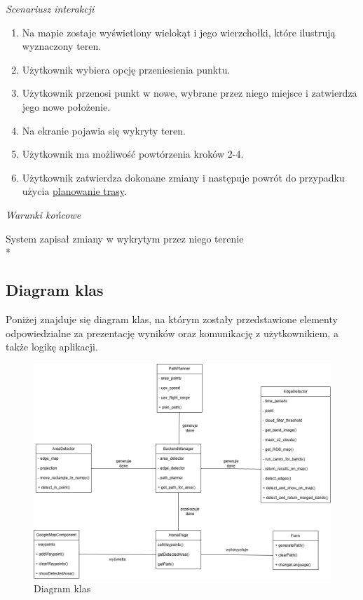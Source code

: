 \textit{Scenariusz interakcji}
\begin{enumerate}
    \item Na mapie zostaje wyświetlony wielokąt i jego wierzchołki, które ilustrują wyznaczony teren.
    \item Użytkownik wybiera opcję przeniesienia punktu.
    \item Użytkownik przenosi punkt w nowe, wybrane przez niego miejsce i zatwierdza jego nowe położenie.
    \item Na ekranie pojawia się wykryty teren.
    \item Użytkownik ma możliwość powtórzenia kroków 2-4.
    \item Użytkownik zatwierdza dokonane zmiany i następuje powrót do przypadku użycia \hyperlink{plan route}{planowanie trasy}.
\end{enumerate}

\vspace{\baselineskip}
\textit{Warunki końcowe}

System zapisał zmiany w wykrytym przez niego terenie \\*

\subsection{Diagram klas}

Poniżej znajduje się diagram klas, na którym zostały przedstawione elementy odpowiedzialne za prezentację wyników oraz komunikację z użytkownikiem, a także logikę aplikacji.

\begin{figure}[H]
    \centering
    \includegraphics[width=15cm]{images/Diagram_klas.png}
    \caption{Diagram klas}
\end{figure}


